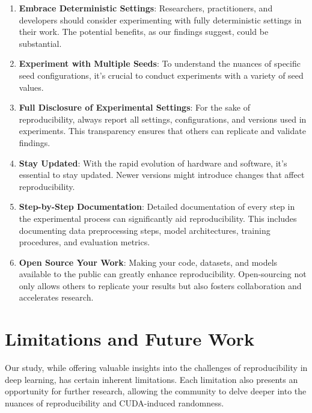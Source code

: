 \begin{enumerate}
    \item \textbf{Embrace Deterministic Settings}: Researchers, practitioners, and developers should consider experimenting with fully deterministic settings in their work. The potential benefits, as our findings suggest, could be substantial.
    \item \textbf{Experiment with Multiple Seeds}: To understand the nuances of specific seed configurations, it's crucial to conduct experiments with a variety of seed values.
    \item \textbf{Full Disclosure of Experimental Settings}: For the sake of reproducibility, always report all settings, configurations, and versions used in experiments. This transparency ensures that others can replicate and validate findings.
    \item \textbf{Stay Updated}: With the rapid evolution of hardware and software, it's essential to stay updated. Newer versions might introduce changes that affect reproducibility.
    \item \textbf{Step-by-Step Documentation}: Detailed documentation of every step in the experimental process can significantly aid reproducibility. This includes documenting data preprocessing steps, model architectures, training procedures, and evaluation metrics.
    \item \textbf{Open Source Your Work}: Making your code, datasets, and models available to the public can greatly enhance reproducibility. Open-sourcing not only allows others to replicate your results but also fosters collaboration and accelerates research.
\end{enumerate}

\section{Limitations and Future Work}

Our study, while offering valuable insights into the challenges of reproducibility in deep learning, has certain inherent limitations. Each limitation also presents an opportunity for further research, allowing the community to delve deeper into the nuances of reproducibility and CUDA-induced randomness.

